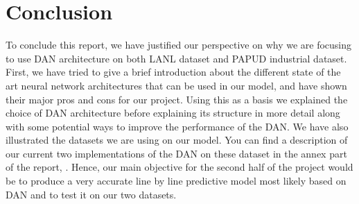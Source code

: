 \chapter*{Conclusion}

To conclude this report, we have justified our perspective on why we are focusing to use DAN architecture on both LANL dataset and PAPUD industrial dataset.
First, we have tried to give a brief introduction about the different state of the art neural network architectures that can be used in our model, and have shown their major pros and cons for our project. Using this as a basis we explained the choice of DAN architecture before explaining its structure in more detail along with some potential ways to improve the performance of the DAN.
We have also illustrated the datasets we are using on our model. You can find a description of our current two implementations of the DAN on these dataset in the annex part of the report, .
Hence, our main objective for the second half of the project would be to produce a very accurate line by line predictive model most likely based on DAN and to test it on our two datasets.